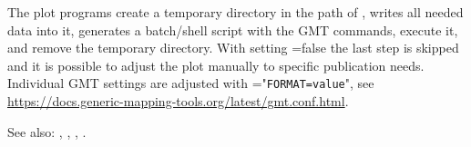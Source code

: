 The plot programs create a temporary directory in the path of , writes all needed data into it,
generates a batch/shell script with the GMT commands, execute it, and remove the temporary directory.
With setting =false the last step is skipped and it is possible to adjust the plot manually
to specific publication needs. Individual GMT settings are adjusted with ="\verb|FORMAT=value|",
see \url{https://docs.generic-mapping-tools.org/latest/gmt.conf.html}.

See also: , , , .



